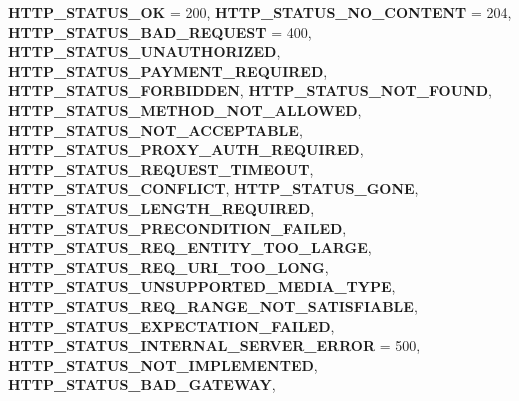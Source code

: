 \begin{DoxyCompactItemize}
\newline
{\bfseries H\+T\+T\+P\+\_\+\+S\+T\+A\+T\+U\+S\+\_\+\+OK} = 200, 
{\bfseries H\+T\+T\+P\+\_\+\+S\+T\+A\+T\+U\+S\+\_\+\+N\+O\+\_\+\+C\+O\+N\+T\+E\+NT} = 204, 
{\bfseries H\+T\+T\+P\+\_\+\+S\+T\+A\+T\+U\+S\+\_\+\+B\+A\+D\+\_\+\+R\+E\+Q\+U\+E\+ST} = 400, 
{\bfseries H\+T\+T\+P\+\_\+\+S\+T\+A\+T\+U\+S\+\_\+\+U\+N\+A\+U\+T\+H\+O\+R\+I\+Z\+ED}, 
\newline
{\bfseries H\+T\+T\+P\+\_\+\+S\+T\+A\+T\+U\+S\+\_\+\+P\+A\+Y\+M\+E\+N\+T\+\_\+\+R\+E\+Q\+U\+I\+R\+ED}, 
{\bfseries H\+T\+T\+P\+\_\+\+S\+T\+A\+T\+U\+S\+\_\+\+F\+O\+R\+B\+I\+D\+D\+EN}, 
{\bfseries H\+T\+T\+P\+\_\+\+S\+T\+A\+T\+U\+S\+\_\+\+N\+O\+T\+\_\+\+F\+O\+U\+ND}, 
{\bfseries H\+T\+T\+P\+\_\+\+S\+T\+A\+T\+U\+S\+\_\+\+M\+E\+T\+H\+O\+D\+\_\+\+N\+O\+T\+\_\+\+A\+L\+L\+O\+W\+ED}, 
\newline
{\bfseries H\+T\+T\+P\+\_\+\+S\+T\+A\+T\+U\+S\+\_\+\+N\+O\+T\+\_\+\+A\+C\+C\+E\+P\+T\+A\+B\+LE}, 
{\bfseries H\+T\+T\+P\+\_\+\+S\+T\+A\+T\+U\+S\+\_\+\+P\+R\+O\+X\+Y\+\_\+\+A\+U\+T\+H\+\_\+\+R\+E\+Q\+U\+I\+R\+ED}, 
{\bfseries H\+T\+T\+P\+\_\+\+S\+T\+A\+T\+U\+S\+\_\+\+R\+E\+Q\+U\+E\+S\+T\+\_\+\+T\+I\+M\+E\+O\+UT}, 
{\bfseries H\+T\+T\+P\+\_\+\+S\+T\+A\+T\+U\+S\+\_\+\+C\+O\+N\+F\+L\+I\+CT}, 
\newline
{\bfseries H\+T\+T\+P\+\_\+\+S\+T\+A\+T\+U\+S\+\_\+\+G\+O\+NE}, 
{\bfseries H\+T\+T\+P\+\_\+\+S\+T\+A\+T\+U\+S\+\_\+\+L\+E\+N\+G\+T\+H\+\_\+\+R\+E\+Q\+U\+I\+R\+ED}, 
{\bfseries H\+T\+T\+P\+\_\+\+S\+T\+A\+T\+U\+S\+\_\+\+P\+R\+E\+C\+O\+N\+D\+I\+T\+I\+O\+N\+\_\+\+F\+A\+I\+L\+ED}, 
{\bfseries H\+T\+T\+P\+\_\+\+S\+T\+A\+T\+U\+S\+\_\+\+R\+E\+Q\+\_\+\+E\+N\+T\+I\+T\+Y\+\_\+\+T\+O\+O\+\_\+\+L\+A\+R\+GE}, 
\newline
{\bfseries H\+T\+T\+P\+\_\+\+S\+T\+A\+T\+U\+S\+\_\+\+R\+E\+Q\+\_\+\+U\+R\+I\+\_\+\+T\+O\+O\+\_\+\+L\+O\+NG}, 
{\bfseries H\+T\+T\+P\+\_\+\+S\+T\+A\+T\+U\+S\+\_\+\+U\+N\+S\+U\+P\+P\+O\+R\+T\+E\+D\+\_\+\+M\+E\+D\+I\+A\+\_\+\+T\+Y\+PE}, 
{\bfseries H\+T\+T\+P\+\_\+\+S\+T\+A\+T\+U\+S\+\_\+\+R\+E\+Q\+\_\+\+R\+A\+N\+G\+E\+\_\+\+N\+O\+T\+\_\+\+S\+A\+T\+I\+S\+F\+I\+A\+B\+LE}, 
{\bfseries H\+T\+T\+P\+\_\+\+S\+T\+A\+T\+U\+S\+\_\+\+E\+X\+P\+E\+C\+T\+A\+T\+I\+O\+N\+\_\+\+F\+A\+I\+L\+ED}, 
\newline
{\bfseries H\+T\+T\+P\+\_\+\+S\+T\+A\+T\+U\+S\+\_\+\+I\+N\+T\+E\+R\+N\+A\+L\+\_\+\+S\+E\+R\+V\+E\+R\+\_\+\+E\+R\+R\+OR} = 500, 
{\bfseries H\+T\+T\+P\+\_\+\+S\+T\+A\+T\+U\+S\+\_\+\+N\+O\+T\+\_\+\+I\+M\+P\+L\+E\+M\+E\+N\+T\+ED}, 
{\bfseries H\+T\+T\+P\+\_\+\+S\+T\+A\+T\+U\+S\+\_\+\+B\+A\+D\+\_\+\+G\+A\+T\+E\+W\+AY}, 

\end{DoxyCompactItemize}
